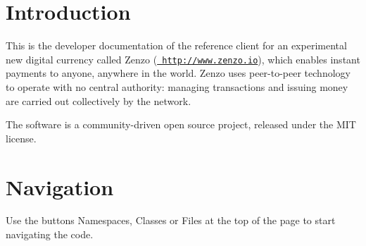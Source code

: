 \hypertarget{index_intro_sec}{}\section{Introduction}\label{index_intro_sec}
This is the developer documentation of the reference client for an experimental new digital currency called Zenzo (\href{http://www.zenzo.io}{\texttt{ http\+://www.\+zenzo.\+io}}), which enables instant payments to anyone, anywhere in the world. Zenzo uses peer-\/to-\/peer technology to operate with no central authority\+: managing transactions and issuing money are carried out collectively by the network.

The software is a community-\/driven open source project, released under the M\+IT license.\hypertarget{index_Navigation}{}\section{Navigation}\label{index_Navigation}
Use the buttons {\ttfamily Namespaces}, {\ttfamily Classes} or {\ttfamily Files} at the top of the page to start navigating the code. 